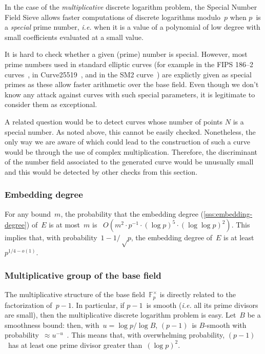 \documentclass[twocolumn,letterpaper,10pt]{article}
\def\F{\mathbb{F}}
\begin{document}
In the case of the \emph{multiplicative} discrete logarithm problem,
the Special Number Field Sieve allows faster computations
of discrete logarithms modulo~$p$
when $p$~is a \emph{special} prime number,
\emph{i.e.} when it is a value of a polynomial of low degree
with small coefficients evaluated at a small value.

It is hard to check whether a given (prime) number is special.
However, most prime numbers used in standard elliptic curves
(for example in the FIPS 186--2 curves~\cite{nist2000fips186-2},
in Curve25519~\cite{pkc2006bernstein},
and in the SM2 curve~\cite{oscca2010sm2})
are explictly given as special primes as these allow faster arithmetic
over the base field.
Even though we don't know any attack against curves with such special
parameters, it is legitimate to consider them as exceptional.

A related question would be to detect curves whose number of points $N$
is a special number.
As noted above, this cannot be easily checked.
Nonetheless, the only way we are aware of which could lead to the construction
of such a curve would be through the use of complex multiplication.
Therefore, the discriminant of the number field associated
to the generated curve would be unusually small and this would be detected by
other checks from this section.

\subsubsection{Embedding degree}

For any bound~$m$, the probability that
the embedding degree (\ref{sss:embedding-degree}) of~$E$ is at most~$m$
is~\cite{jc1998bk} $O(m^2 · p^{-1}·(\log p)^5·(\log\log p)^2)$.
This implies that, with probability~$1 - 1/√p$,
the embedding degree of~$E$ is at least~$p^{1/4 - o(1)}$.

\subsubsection{Multiplicative group of the base field}

The multiplicative structure of the base field~$\F_p^{×}$
is directly related to the factorization of~$p-1$.
In particular, if $p-1$~is smooth
(\emph{i.e.} all its prime divisors are small),
then the multiplicative discrete logarithm problem is easy.
Let~$B$ be a smoothness bound: then, with~$u = \log p / \log B$,
$(p-1)$~is $B$-smooth with probability~$≈ u^{-u}$~\cite{jnt1983cep}.
This means that, with overwhelming probability,
$(p-1)$~has at least one prime divisor greater than~$(\log p)^2$.
\end{document}
